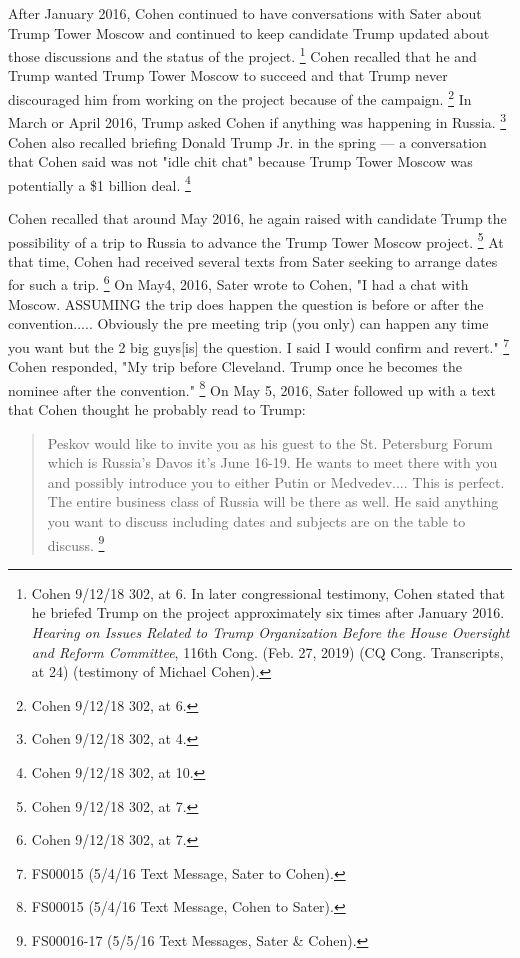 After January 2016, Cohen continued to have conversations with Sater about Trump Tower Moscow and continued to keep candidate Trump updated about those discussions and the status of the project.%
\footnote{Cohen 9/12/18 302, at 6.
In later congressional testimony, Cohen stated that he briefed Trump on the project approximately six times after January 2016.
\textit{Hearing on Issues Related to Trump Organization Before the House Oversight and Reform Committee}, 116th Cong.
(Feb. 27, 2019) (CQ Cong. Transcripts, at 24) (testimony of Michael Cohen).}
Cohen recalled that he and Trump wanted Trump Tower Moscow to succeed and that Trump never discouraged him from working on the project because of the campaign.%
\footnote{Cohen 9/12/18 302, at 6.}
In March or April 2016, Trump asked Cohen if anything was happening in Russia.%
\footnote{Cohen 9/12/18 302, at 4.}
Cohen also recalled briefing Donald Trump Jr. in the spring — a conversation that Cohen said was not "idle chit chat" because Trump Tower Moscow was potentially a \$1 billion deal.%
\footnote{Cohen 9/12/18 302, at 10.}

Cohen recalled that around May 2016, he again raised with candidate Trump the possibility of a trip to Russia to advance the Trump Tower Moscow project.%
\footnote{Cohen 9/12/18 302, at 7.}
At that time, Cohen had received several texts from Sater seeking to arrange dates for such a trip.%
\footnote{Cohen 9/12/18 302, at 7.}
On May4, 2016, Sater wrote to Cohen, "I had a chat with Moscow.
ASSUMING the trip does happen the question is before or after the convention.....
Obviously the pre meeting trip (you only) can happen any time you want but the 2 big guys[is] the question.
I said I would confirm and revert."%
\footnote{FS00015 (5/4/16 Text Message, Sater to Cohen).}
Cohen responded, "My trip before Cleveland.
Trump once he becomes the nominee after the convention."%
\footnote{FS00015 (5/4/16 Text Message, Cohen to Sater).}
On May 5, 2016, Sater followed up with a text that Cohen thought he probably read to Trump:

\begin{quote}
Peskov would like to invite you as his guest to the St. Petersburg Forum which is Russia's Davos it's June 16-19.
He wants to meet there with you and possibly introduce you to either Putin or Medvedev....
This is perfect.
The entire business class of Russia will be there as well.
He said anything you want to discuss including dates and subjects are on the table to discuss.%
\footnote{FS00016-17 (5/5/16 Text Messages, Sater \& Cohen).}
\end{quote}

